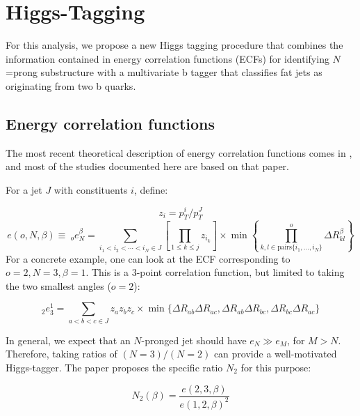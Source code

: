 \clearpage
\section{Higgs-Tagging}
\label{sec:higgstagging}

For this analysis, we propose a new Higgs tagging procedure that combines the information contained in energy correlation functions (ECFs) for identifying $N$=prong substructure with a multivariate b tagger that classifies fat jets as originating from two b quarks. %

\subsection{Energy correlation functions}

The most recent theoretical description of energy correlation functions comes in \cite{ecf}, and most of the studies documented here are based on that paper. 

For a jet $J$ with constituents $i$, define:

\begin{equation}
  z_i = {p_T^i}\Big/{p_T^J}
\end{equation}
\begin{equation}
  e(o,N,\beta) \equiv ~_o e_N^\beta = \sum _{i_1<i_2<\cdots<i_N \in J}  \left[\prod_{1\leq k \leq j} z_{i_k}\right] \times \min\left\{\prod_{k,l\in \text{pairs}\{i_1,\dots,i_N\}}^o \Delta R_{kl}^\beta\right\} 
\end{equation}
For a concrete example, one can look at the ECF corresponding to $o=2, N=3, \beta=1$. This is a 3-point correlation function,  but limited to taking the two smallest angles ($o=2$):

\begin{equation}
  _2e_3^1 =  \sum _{a<b<c \in J}  z_az_bz_c \times \min\{\Delta R_{ab}\Delta R_{ac},\Delta R_{ab}\Delta R_{bc},\Delta R_{bc}\Delta R_{ac}\}
\end{equation}

In general, we expect that an $N$-pronged jet should have $e_N \gg e_M$, for $M>N$. Therefore, taking ratios of $(N=3)/(N=2)$ can provide a well-motivated Higgs-tagger. The paper proposes the specific ratio $N_2$ for this purpose:

\begin{equation}
  N_2(\beta) = \frac{e(2,3,\beta)}{e(1,2,\beta)^2}
\end{equation}

